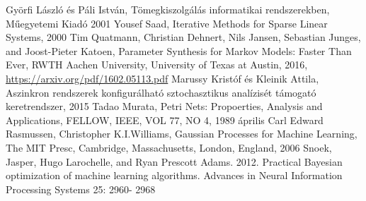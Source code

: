 
\begin{thebibliography}{widestlabel}
	 Györfi László és Páli István, Tömegkiszolgálás informatikai rendszerekben, Műegyetemi Kiadó 2001
	 Yousef Saad, Iterative Methods for Sparse Linear Systems, 2000
	 Tim Quatmann, Christian Dehnert, Nils Jansen,	Sebastian Junges, and Joost-Pieter Katoen, Parameter Synthesis for Markov Models: Faster Than Ever, RWTH Aachen University, University of Texas at Austin, 2016, \url{https://arxiv.org/pdf/1602.05113.pdf}
	 Marussy Kristóf és Kleinik Attila, Aszinkron rendszerek konfigurálható sztochasztikus analízisét támogató keretrendszer, 2015
	 Tadao Murata, Petri Nets: Propoerties, Analysis and Applications, FELLOW, IEEE, VOL 77, NO 4, 1989 április
	Carl Edward Rasmussen, Christopher K.I.Williams, Gaussian Processes for Machine Learning, The MIT Presc, Cambridge, Massachusetts, London, England, 2006
	 Snoek, Jasper, Hugo Larochelle, and Ryan Prescott Adams. 2012.
	Practical Bayesian optimization of machine learning algorithms.
	Advances in Neural Information Processing Systems 25: 2960-
	2968

\end{thebibliography}